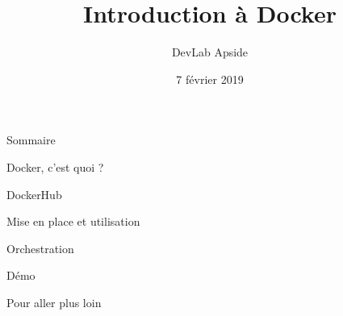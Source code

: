 \documentclass{beamer}
\title{Introduction à Docker}
\subtitle{DevLab Apside}
\date{7 février 2019}
\begin{document}
\begin{frame}
  \titlepage
\end{frame}

\begin{frame}[noframenumbering]{Sommaire}
    \tableofcontents
\end{frame}

\begin{section}{Docker, c'est quoi ?}
    
\end{section}


\begin{section}{DockerHub}
    
\end{section}


\begin{section}{Mise en place et utilisation}
    
\end{section}

\begin{section}{Orchestration}
    
\end{section}

\begin{section}{Démo}
    
\end{section}

\begin{section}{Pour aller plus loin}



\end{section}




\end{document}
